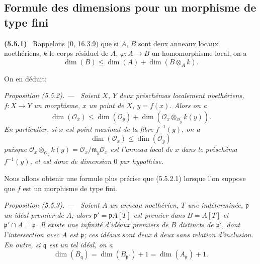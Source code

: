 \documentclass[10pt,oneside]{book}
\newcommand{\oldpage}[2][]{%
  \setcounter{footnote}{0}%
  \marginpar{\scriptsize\textbf{#1}~|~#2}\ignorespaces}
\newenvironment{env}[1][]{\par\medskip\noindent\textbf{(#1)}\ }{\par}
\newenvironment{proposition}[1][]{%
  \par\medskip\noindent\itshape Proposition (#1). ---\ }{\par}
\begin{document}
\subsection{Formule des dimensions pour un morphisme de type fini}
\label{IV.2.s5.5-fr}

\begin{env}[5.5.1]
\label{IV.2.s5.5.1-fr}
Rappelons (0, 16.3.9) que si $A$, $B$ sont deux anneaux locaux noethériens,
$k$ le corps résiduel de $A$, $\varphi:A\to B$ un homomorphisme local, on a
\begin{equation}
\dim(B)\leq\dim(A)+\dim(B\otimes_A k).
\tag{5.5.1.1}\label{IV.2.s5.5.1.1-fr}
\end{equation}
\end{env}

On en déduit:

\begin{proposition}[5.5.2]
\label{IV.2.s5.5.2-fr}
Soient $X$, $Y$ deux préschémas localement noethériens, $f:X\to Y$ un
morphisme, $x$ un point de $X$, $y=f(x)$. Alors on a
\begin{equation}
\dim(\mathcal O_x)\leq\dim(\mathcal O_y)
+\dim(\mathcal O_x\otimes_{\mathcal O_y}k(y)).
\tag{5.5.2.1}\label{IV.2.s5.5.2.1-fr}
\end{equation}
En particulier, si $x$ est point maximal de la fibre $f^{-1}(y)$, on a
\begin{equation}
\dim(\mathcal O_x)\leq\dim(\mathcal O_y)
\tag{5.5.2.2}\label{IV.2.s5.5.2.2-fr}
\end{equation}
puisque $\mathcal O_x\otimes_{\mathcal O_y}k(y)
=\mathcal O_x/\mathfrak m_y\mathcal O_x$ est l'anneau local de $x$ dans le
préschéma $f^{-1}(y)$, et est donc de dimension $0$ par hypothèse.
\end{proposition}

\oldpage[IV-2]{95}

Nous allons obtenir une formule plus précise que (5.5.2.1) lorsque l'on
suppose que $f$ est un morphisme de type fini.

\begin{proposition}[5.5.3]
\label{IV.2.s5.5.3-fr}
Soient $A$ un anneau noethérien, $T$ une indéterminée, $\mathfrak p$ un idéal
premier de $A$; alors $\mathfrak p'=\mathfrak pA[T]$ est premier dans
$B=A[T]$ et $\mathfrak p'\cap A=\mathfrak p$. Il existe une infinité
d'idéaux premiers de $B$ distincts de $\mathfrak p'$, dont l'intersection
avec $A$ est $\mathfrak p$; ces idéaux sont deux à deux sans relation
d'inclusion. En outre, si $\mathfrak q$ est un tel idéal, on a
\begin{equation}
\dim(B_{\mathfrak q})=\dim(B_{\mathfrak p'})+1
=\dim(A_{\mathfrak p})+1.
\tag{5.5.3.1}\label{IV.2.s5.5.3.1-fr}
\end{equation}
\end{proposition}
\end{document}
